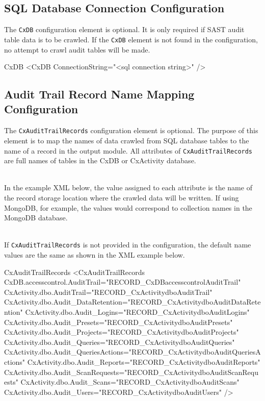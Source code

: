 \subsection{SQL Database Connection Configuration}

The \texttt{CxDB} configuration element is optional.  It is only required if SAST audit table data is to be crawled.  If the
\texttt{CxDB} element is not found in the configuration, no attempt to crawl audit tables will be made.

\begin{xml}{CxDB}{\expandsenv\encrypts}{}
<CxDB 
    ConnectionString="<sql connection string>" 
    />
\end{xml}

\subsection{Audit Trail Record Name Mapping Configuration}

The \texttt{CxAuditTrailRecords} configuration element is optional.  The purpose of this element is to map the names of data
crawled from SQL database tables to the name of a record in the output module.  All attributes of \texttt{CxAuditTrailRecords}
are full names of tables in the CxDB or CxActivity database.

\noindent\\In the example XML below, the value assigned to each attribute is the name of the record storage location where the crawled 
data will be written.  If using MongoDB, for example, the values would correspond to collection names in the MongoDB database.

\noindent\\If \texttt{CxAuditTrailRecords} is not provided in the configuration, the default name values are the same
as shown in the XML example below.

\begin{xml}{CxAuditTrailRecords}{}{}
<CxAuditTrailRecords
    CxDB.accesscontrol.AuditTrail="RECORD_CxDBaccesscontrolAuditTrail"
    CxActivity.dbo.AuditTrail="RECORD_CxActivitydboAuditTrail"
    CxActivity.dbo.Audit_DataRetention="RECORD_CxActivitydboAuditDataRetention"
    CxActivity.dbo.Audit_Logins="RECORD_CxActivitydboAuditLogins"
    CxActivity.dbo.Audit_Presets="RECORD_CxActivitydboAuditPresets"
    CxActivity.dbo.Audit_Projects="RECORD_CxActivitydboAuditProjects"
    CxActivity.dbo.Audit_Queries="RECORD_CxActivitydboAuditQueries"
    CxActivity.dbo.Audit_QueriesActions="RECORD_CxActivitydboAuditQueriesActions"
    CxActivity.dbo.Audit_Reports="RECORD_CxActivitydboAuditReports"
    CxActivity.dbo.Audit_ScanRequests="RECORD_CxActivitydboAuditScanRequests"
    CxActivity.dbo.Audit_Scans="RECORD_CxActivitydboAuditScans"
    CxActivity.dbo.Audit_Users="RECORD_CxActivitydboAuditUsers"
    />
\end{xml}


